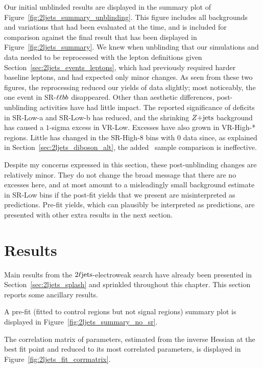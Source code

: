 Our initial unblinded results are displayed in the summary plot of
Figure~\ref{fig:2ljets_summary_unblinding}.
This figure includes all backgrounds and variations that had been evaluated
at the time, and is included for comparison against the final result
that has been displayed in Figure~\ref{fig:2ljets_summary}.
We knew when unblinding that our simulations and data needed to be reprocessed
with the lepton definitions given Section~\ref{sec:2ljets_events_leptons},
which had previously required harder baseline leptons,
and had expected only minor changes.
As seen from these two figures, the reprocessing reduced our yields of data
slightly; most noticeably, the one event in SR-$\ell\ell bb$ disappeared.
Other than aesthetic differences, post-unblinding activities have had little
impact.
The reported significance of deficits in SR-Low-a and SR-Low-b has reduced,
and the shrinking $Z\mathrm{+jets}$ background has caused a $1$-sigma excess in VR-Low.
Excesses have also grown in VR-High-* regions.
Little has changed in the SR-High-8 bins with $0$ data since, as explained in
Section~\ref{sec:2ljets_diboson_alt}, the added \diboson\ sample comparison
is ineffective.

Despite my concerns expressed in this section, these post-unblinding changes
are relatively minor.
They do not change the broad message that there are no excesses here, and at
most amount to a misleadingly small background estimate in SR-Low bins if the
post-fit yields that we present are misinterpreted as predictions.
Pre-fit yields, which can plausibly be interpreted as predictions, are
presented with other extra results in the next section.


\section{Results}
\label{sec:2ljets_results}

Main results from the $2\ell\mathrm{jets}$-electroweak search have already been
presented in Section~\ref{sec:2ljets_splash} and sprinkled throughout this
chapter.
This section reports some ancillary results.


A pre-fit (fitted to control regions but not signal regions) summary plot
is displayed in Figure~\ref{fig:2ljets_summary_no_sr}.

The correlation matrix of parameters, estimated from the inverse Hessian at
the best fit point and reduced to its most correlated parameters, is displayed
in Figure~\ref{fig:2ljets_fit_corrmatrix}.

